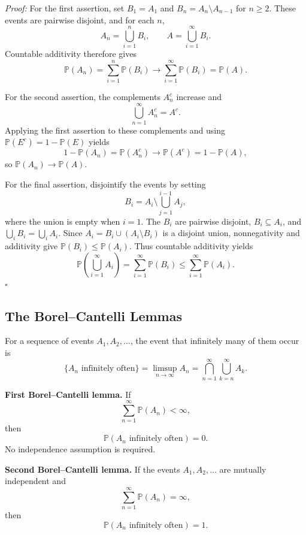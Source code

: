 \documentclass[a4paper,11pt,abstracton]{scrartcl}
\theoremstyle{dotlessP}
\theoremstyle{dotlessS}
\theoremstyle{remark}
\theoremstyle{definition}
\begin{document}
\begin{claim_box}
\textit{Proof:} For the first assertion, set $B_1=A_1$ and $B_n=A_n\setminus A_{n-1}$ for $n\geq2$. These events are pairwise disjoint, and for each $n$,
\[
  A_n=\bigcup_{i=1}^{n}B_i,
  \qquad
  A=\bigcup_{i=1}^{\infty}B_i.
\]
Countable additivity therefore gives
\[
  \mathbb{P}(A_n)=\sum_{i=1}^{n}\mathbb{P}(B_i)
  \longrightarrow \sum_{i=1}^{\infty}\mathbb{P}(B_i)=\mathbb{P}(A).
\]

For the second assertion, the complements $A_n^c$ increase and
\[
  \bigcup_{n=1}^{\infty}A_n^c=A^c.
\]
Applying the first assertion to these complements and using $\mathbb{P}(E^c)=1-\mathbb{P}(E)$ yields
\[
  1-\mathbb{P}(A_n)=\mathbb{P}(A_n^c)
  \longrightarrow\mathbb{P}(A^c)=1-\mathbb{P}(A),
\]
so $\mathbb{P}(A_n)\to\mathbb{P}(A)$.

For the final assertion, disjointify the events by setting
\[
  B_i=A_i\setminus\bigcup_{j=1}^{i-1}A_j,
\]
where the union is empty when $i=1$. The $B_i$ are pairwise disjoint, $B_i\subseteq A_i$, and $\bigcup_i B_i=\bigcup_i A_i$. Since $A_i=B_i\cup(A_i\setminus B_i)$ is a disjoint union, nonnegativity and additivity give $\mathbb{P}(B_i)\leq\mathbb{P}(A_i)$. Thus countable additivity yields
\[
  \mathbb{P}\!\left(\bigcup_{i=1}^{\infty}A_i\right)
  =\sum_{i=1}^{\infty}\mathbb{P}(B_i)
  \leq\sum_{i=1}^{\infty}\mathbb{P}(A_i).
\]
\hfill$\square$
\end{claim_box}

\subsection{The Borel--Cantelli Lemmas}

For a sequence of events $A_1,A_2,\ldots$, the event that infinitely many of them occur is
\[
  \{A_n\text{ infinitely often}\}
  =\limsup_{n\to\infty}A_n
  =\bigcap_{n=1}^{\infty}\bigcup_{k=n}^{\infty}A_k.
\]

\begin{problem_box}
\textbf{First Borel--Cantelli lemma.} If
\[
  \sum_{n=1}^{\infty}\mathbb{P}(A_n)<\infty,
\]
then
\[
  \mathbb{P}(A_n\text{ infinitely often})=0.
\]
No independence assumption is required.

\textbf{Second Borel--Cantelli lemma.} If the events $A_1,A_2,\ldots$ are mutually independent and
\[
  \sum_{n=1}^{\infty}\mathbb{P}(A_n)=\infty,
\]
then
\[
  \mathbb{P}(A_n\text{ infinitely often})=1.
\]
\end{problem_box}
\end{document}

